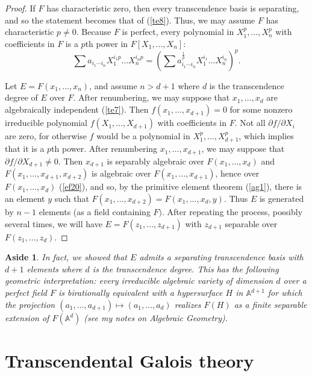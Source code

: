 \documentclass[a4paper,11pt,final,openany]{memoir}
\newtheorem{aside}[X]{Aside}
\theoremstyle{nonumberplain}
\newtheorem{proof}{Proof.}
\begin{document}
\begin{proof}
If $F$ has characteristic zero, then every transcendence basis is separating,
and so the statement becomes that of (\ref{te8}). Thus, we may assume $F$ has
characteristic $p\neq0$. Because $F$ is perfect, every polynomial in
$X_{1}^{p},\ldots,X_{n}^{p}$ with coefficients in $F$ is a $p$th power in
$F[X_{1},\ldots,X_{n}]$:%
\[
\sum a_{i_{1}\cdots i_{n}}X_{1}^{i_{1}p}\ldots X_{n}^{i_{n}p}=\left(  \sum
a_{i_{1}\cdots i_{n}}^{\frac{1}{p}}X_{1}^{i_{1}}\ldots X_{n}^{i_{n}}\right)
^{p}.
\]


Let $E=F(x_{1},\ldots,x_{n})$, and assume $n>d+1$ where $d$ is the
transcendence degree of $E$ over $F$. After renumbering, we may suppose that
$x_{1},\ldots,x_{d}$ are algebraically independent (\ref{te7}). Then
$f(x_{1},\ldots,x_{d+1})=0$ for some nonzero irreducible polynomial
$f(X_{1},\ldots,X_{d+1})$ with coefficients in $F$. Not all $\partial
f/\partial X_{i}$ are zero, for otherwise $f$ would be a polynomial in
$X_{1}^{p},\ldots,X_{d+1}^{p}$, which implies that it is a $p$th power. After
renumbering $x_{1},\ldots,x_{d+1}$, we may suppose that $\partial f/\partial
X_{d+1}\neq0$. Then $x_{d+1}$ is separably algebraic over $F(x_{1}%
,\ldots,x_{d})$ and $F(x_{1},\ldots,x_{d+1},x_{d+2})$ is algebraic over
$F(x_{1},\ldots,x_{d+1})$, hence over $F(x_{1},\ldots,x_{d})$ (\ref{ef20}),
and so, by the primitive element theorem (\ref{ag1}), there is an element $y$
such that $F(x_{1},\ldots,x_{d+2})=F(x_{1},\ldots,x_{d},y)$. Thus $E$ is
generated by $n-1$ elements (as a field containing $F)$. After repeating the
process, possibly several times, we will have $E=F(z_{1},\ldots,z_{d+1})$ with
$z_{d+1}$ separable over $F(z_{1},\ldots,z_{d})$.
\end{proof}

\begin{aside}
\label{te20}In fact, we showed that $E$ admits a separating transcendence
basis with $d+1$ elements where $d$ is the transcendence degree. This has the
following geometric interpretation: every irreducible algebraic variety of
dimension $d$ over a perfect field $F$ is birationally equivalent with a
hypersurface $H$ in $\mathbb{A}{}^{d+1}$ for which the projection
$(a_{1},\ldots,a_{d+1})\mapsto(a_{1},\ldots,a_{d})$ realizes $F(H)$ as a
finite separable extension of $F(\mathbb{A}{}^{d})$ (see my notes on Algebraic Geometry).
\end{aside}

\section{Transcendental Galois theory}
\end{document}
